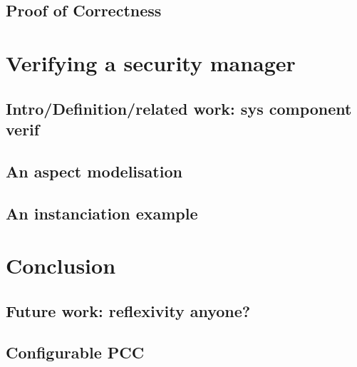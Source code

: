 \documentclass[draft]{llncs}
\begin{document}
\subsection{Proof of Correctness}
%
\section{Verifying a security manager}
\subsection{Intro/Definition/related work: sys component verif}
\subsection{An aspect modelisation}
\subsection{An instanciation example}
\section{Conclusion}
\subsection{Future work: reflexivity anyone?}
\subsection{Configurable PCC}
%
%




%
\end{document}
